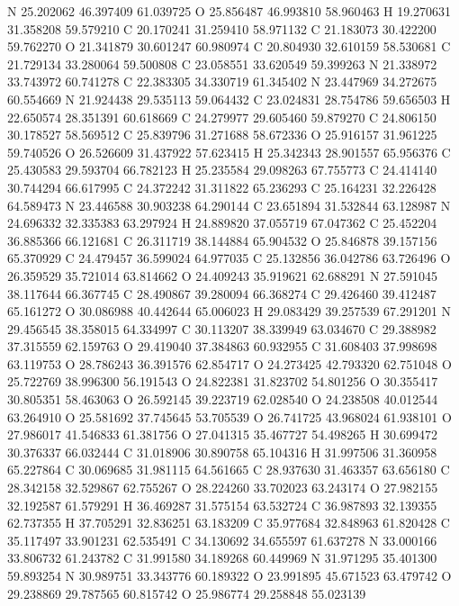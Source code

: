 \documentclass{article}
\begin{document}
N 25.202062 46.397409 61.039725 
O 25.856487 46.993810 58.960463 
H 19.270631 31.358208 59.579210 
C 20.170241 31.259410 58.971132 
C 21.183073 30.422200 59.762270 
O 21.341879 30.601247 60.980974 
C 20.804930 32.610159 58.530681 
C 21.729134 33.280064 59.500808 
C 23.058551 33.620549 59.399263 
N 21.338972 33.743972 60.741278 
C 22.383305 34.330719 61.345402 
N 23.447969 34.272675 60.554669 
N 21.924438 29.535113 59.064432 
C 23.024831 28.754786 59.656503 
H 22.650574 28.351391 60.618669 
C 24.279977 29.605460 59.879270 
C 24.806150 30.178527 58.569512 
C 25.839796 31.271688 58.672336 
O 25.916157 31.961225 59.740526 
O 26.526609 31.437922 57.623415 
H 25.342343 28.901557 65.956376 
C 25.430583 29.593704 66.782123 
H 25.235584 29.098263 67.755773 
C 24.414140 30.744294 66.617995 
C 24.372242 31.311822 65.236293 
C 25.164231 32.226428 64.589473 
N 23.446588 30.903238 64.290144 
C 23.651894 31.532844 63.128987 
N 24.696332 32.335383 63.297924 
H 24.889820 37.055719 67.047362 
C 25.452204 36.885366 66.121681 
C 26.311719 38.144884 65.904532 
O 25.846878 39.157156 65.370929 
C 24.479457 36.599024 64.977035 
C 25.132856 36.042786 63.726496 
O 26.359529 35.721014 63.814662 
O 24.409243 35.919621 62.688291 
N 27.591045 38.117644 66.367745 
C 28.490867 39.280094 66.368274 
C 29.426460 39.412487 65.161272 
O 30.086988 40.442644 65.006023 
H 29.083429 39.257539 67.291201 
N 29.456545 38.358015 64.334997 
C 30.113207 38.339949 63.034670 
C 29.388982 37.315559 62.159763 
O 29.419040 37.384863 60.932955 
C 31.608403 37.998698 63.119753 
O 28.786243 36.391576 62.854717 
O 24.273425 42.793320 62.751048 
O 25.722769 38.996300 56.191543 
O 24.822381 31.823702 54.801256 
O 30.355417 30.805351 58.463063 
O 26.592145 39.223719 62.028540 
O 24.238508 40.012544 63.264910 
O 25.581692 37.745645 53.705539 
O 26.741725 43.968024 61.938101 
O 27.986017 41.546833 61.381756 
O 27.041315 35.467727 54.498265 
H 30.699472 30.376337 66.032444 
C 31.018906 30.890758 65.104316 
H 31.997506 31.360958 65.227864 
C 30.069685 31.981115 64.561665 
C 28.937630 31.463357 63.656180 
C 28.342158 32.529867 62.755267 
O 28.224260 33.702023 63.243174 
O 27.982155 32.192587 61.579291 
H 36.469287 31.575154 63.532724 
C 36.987893 32.139355 62.737355 
H 37.705291 32.836251 63.183209 
C 35.977684 32.848963 61.820428 
C 35.117497 33.901231 62.535491 
C 34.130692 34.655597 61.637278 
N 33.000166 33.806732 61.243782 
C 31.991580 34.189268 60.449969 
N 31.971295 35.401300 59.893254 
N 30.989751 33.343776 60.189322 
O 23.991895 45.671523 63.479742 
O 29.238869 29.787565 60.815742 
O 25.986774 29.258848 55.023139 
\end{document}
